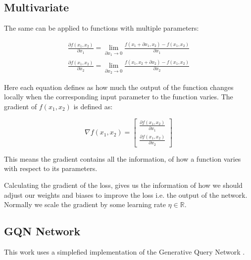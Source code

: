 \subsection{Multivariate}
The same can be applied to functions with multiple parameters:

\begin{equation}
\begin{split}
	\frac{\partial f(x_1, x_2)}{\partial x_1} = \lim_{\partial x_1 \to 0}\frac{f(x_1 + \partial x_1, x_2) - f(x_1, x_2)}{\partial x_1} \\
	\frac{\partial f(x_1, x_2)}{\partial x_2} = \lim_{\partial x_2 \to 0}\frac{f(x_1, x_2 + \partial x_2) - f(x_1, x_2)}{\partial x_2}
\end{split}
\end{equation}

Here each equation defines as how much the output of the function changes locally when the corresponding input parameter to the function varies.
The gradient of $f(x_1, x_2)$ is defined as:

\begin{equation}
\nabla f(x_1, x_2) =
	\begin{bmatrix}
	\frac{\partial f(x_1, x_2)}{\partial x_1} \\[2mm]
	\frac{\partial f(x_1, x_2)}{\partial x_2}
	\end{bmatrix}
\end{equation}

This means the gradient contains all the information, of how a function varies with respect to its parameters.

Calculating the gradient of the loss, gives us the information of how we should adjust our weights and biases to improve the loss i.e. the output of the network. Normally we scale the gradient by some learning rate $\eta \in \mathbb{R}$.




\subsection{GQN Network}
This work uses a simplefied implementation of the Generative Query Network \cite{gqn}.

